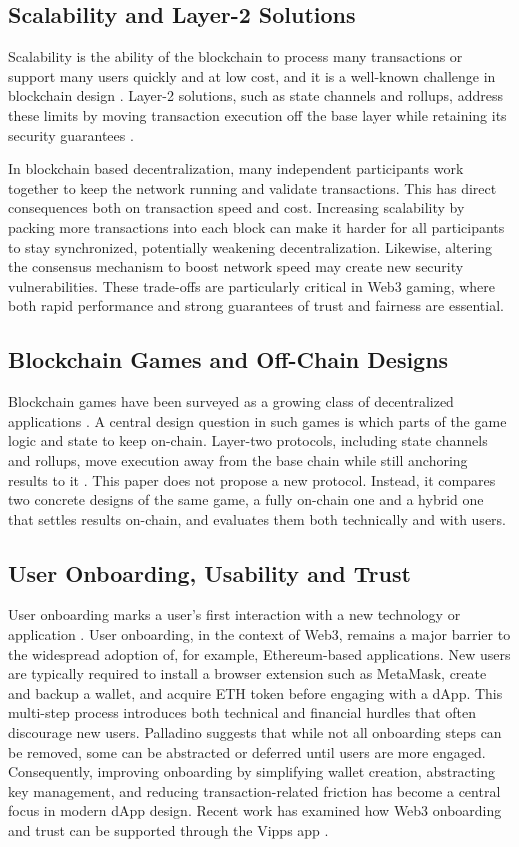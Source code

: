 \documentclass[10pt,conference]{IEEEtran}
\begin{document}
\subsection{Scalability and Layer-2 Solutions}
Scalability is the ability of the blockchain to process many transactions or support
many users quickly and at low cost, and it is a well-known challenge in blockchain design \cite{Scalability8968381}. Layer-2 solutions, such as state channels and rollups, address these limits by moving transaction execution off the base layer while retaining its security guarantees \cite{Gudgeon2020,Thibault2022}.

In blockchain based decentralization, many independent
participants work together to keep the network running and validate transactions. This has direct consequences both on transaction speed and cost.
%
Increasing scalability by packing more transactions into each block can make it harder for all participants to stay synchronized, potentially weakening decentralization. Likewise, altering the consensus mechanism to boost network speed may create new security vulnerabilities. These trade-offs are particularly critical in Web3 gaming, where both rapid performance and strong guarantees of trust and fairness are essential.


\subsection{Blockchain Games and Off-Chain Designs}
Blockchain games have been surveyed as a growing class of decentralized applications \cite{Min2019}. A central design question in such games is which parts of the game logic and state to keep on-chain. Layer-two protocols, including state channels and rollups, move execution away from the base chain while still anchoring results to it \cite{Gudgeon2020,Thibault2022}. This paper does not propose a new protocol. Instead, it compares two concrete designs of the same game, a fully on-chain one and a hybrid one that settles results on-chain, and evaluates them both technically and with users.

\subsection{User Onboarding, Usability and Trust}
User onboarding marks a user’s first interaction with a new technology or application \cite{Duran2020}. User onboarding, in the context of Web3, remains a major barrier to the widespread adoption of, for example, Ethereum-based applications. New users are typically required to install a browser extension such as MetaMask, create and backup a wallet, and acquire ETH token before engaging with a dApp. This multi-step process introduces both technical and financial hurdles that often discourage new users. Palladino \cite{Palladino2019} suggests that while not all onboarding steps can be removed, some can be abstracted or deferred until users are more engaged. Consequently, improving onboarding by simplifying wallet creation, abstracting key management, and reducing transaction-related friction has become a central focus in modern dApp design. Recent work has examined how Web3 onboarding and trust can be supported through the Vipps app \cite{Kathayat2026}.
\end{document}
